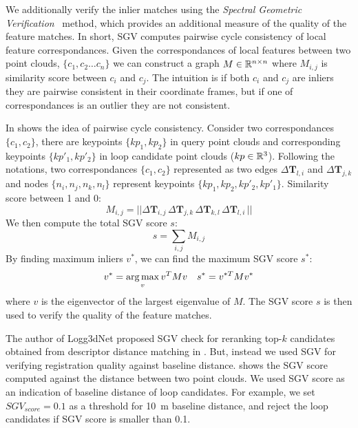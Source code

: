 We additionally verify the inlier matches using the \emph{Spectral Geometric Verification}~\cite{vidanapathirana2023ral} method, which provides an additional measure of the quality of the feature matches. In short, SGV computes pairwise cycle consistency of local feature correspondances. Given the correspondances of local features between two point clouds, $\{c_1, c_2 \ldots c_n\}$ we can construct a graph $M \in \mathbb{R}^{n \times n}$ where $M_{i,j}$ is similarity score between $c_i$ and $c_j$. The intuition is if both $c_i$ and $c_j$ are inliers they are pairwise consistent in their coordinate frames, but if one of correspondances is an outlier they are not consistent. 

In  shows the idea of pairwise cycle consistency. Consider two correspondances $\{c_1, c_2\}$, there are keypoints $\{kp_1, kp_2\}$ in query point clouds and corresponding keypoints $\{kp'_1, kp'_2\}$ in loop candidate point clouds ($kp \in \mathbb{R}^{3}$). Following the  notations, two correspondances $\{c_1, c_2\}$ represented as two edges $\Delta\mathbf{T}_{l,i}$ and $\Delta\mathbf{T}_{j,k}$ and nodes $\{n_i, n_j, n_k, n_l\}$ represent keypoints  $\{kp_1, kp_2, kp'_2, kp'_1\}$.
Similarity score between 1 and 0:
\begin{equation}
  M_{i,j} = ||\Delta\mathbf{T}_{i,j}\, \Delta\mathbf{T}_{j,k}\, \Delta\mathbf{T}_{k,l}\, \Delta\mathbf{T}_{l,i}\, ||
\end{equation}
We then compute the total SGV score $s$:
\begin{equation}
  s = \sum_{i,j} M_{i,j} 
\end{equation}
By finding maximum inliers $v^{*}$, we can find the maximum SGV score $s^{*}$: 
\begin{equation}
  v^{*} = \operatorname*{arg\,max}_{v} v^T M v \quad
  s^{*} = v^{*T} M v^{*}
\end{equation}
where $v$ is the eigenvector of the largest eigenvalue of $M$. The SGV score $s$ is then used to verify the quality of the feature matches.

The author of Logg3dNet proposed SGV check for reranking top-$k$ candidates obtained from descriptor distance matching in . But, instead we used SGV for verifying registration quality against baseline distance.  shows the SGV score computed against the distance between two point clouds. We used SGV score as an indication of baseline distance of loop candidates. For example, we set $SGV_{score}=0.1$ as a threshold for \SI{10}{\meter} baseline distance, and reject the loop candidates if SGV score is smaller than 0.1.



